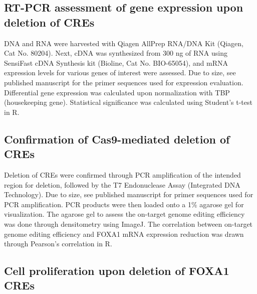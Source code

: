 \subsection{RT-PCR assessment of gene expression upon deletion of CREs}

DNA and RNA were harvested with Qiagen AllPrep RNA/DNA Kit (Qiagen, Cat No. 80204).
Next, cDNA was synthesized from 300 ng of RNA using SensiFast cDNA Synthesis kit (Bioline, Cat No. BIO-65054), and mRNA expression levels for various genes of interest were assessed.
Due to size, see published manuscript for the primer sequences used for expression evaluation.
Differential gene expression was calculated upon normalization with TBP (housekeeping gene).
Statistical significance was calculated using Student's t-test in R.

\subsection{Confirmation of Cas9-mediated deletion of CREs}

Deletion of CREs were confirmed through PCR amplification of the intended region for deletion, followed by the T7 Endonuclease Assay (Integrated DNA Technology).
Due to size, see published manuscript for primer sequences used for PCR amplification.
PCR products were then loaded onto a 1\% agarose gel for visualization.
The agarose gel to assess the on-target genome editing efficiency was done through densitometry using ImageJ.
The correlation between on-target genome editing efficiency and FOXA1 mRNA expression reduction was drawn through Pearson's correlation in R.

\subsection{Cell proliferation upon deletion of FOXA1 CREs}

